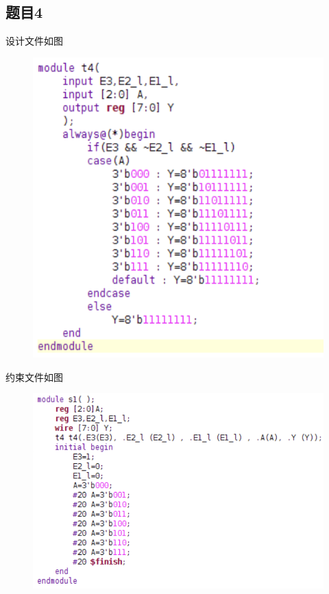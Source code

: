 \documentclass{article}
\begin{document}
    \subsection*{题目4}
	设计文件如图
    \begin{figure}[htbp]
        \centering
        \includegraphics[scale=0.8]{t4v.png}
    \end{figure}
    \clearpage
    约束文件如图
    \begin{figure}[htbp]
        \centering
        \includegraphics[scale=1]{t4s.png}
    \end{figure}
\end{document}
